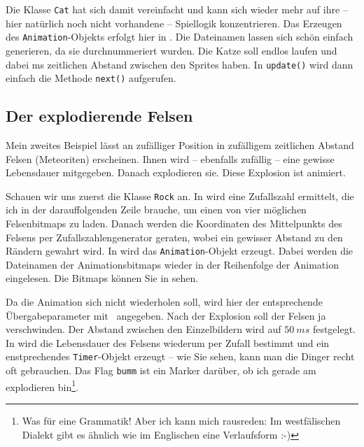 Die Klasse \texttt{Cat} hat sich damit vereinfacht und kann sich wieder mehr auf ihre -- hier natürlich noch nicht vorhandene -- Spiellogik konzentrieren. Das Erzeugen des \texttt{Animation}-Objekts erfolgt hier in . Die Dateinamen lassen sich schön einfach generieren, da sie durchnummeriert wurden. Die Katze soll endlos laufen und dabei \unit[100]{ms} zeitlichen Abstand zwischen den Sprites haben. In \texttt{update()} wird dann einfach die Methode \texttt{next()} aufgerufen.

\newpage
{} 

\subsection{Der explodierende Felsen}

Mein zweites Beispiel lässt an zufälliger Position in zufälligem zeitlichen Abstand Felsen (Meteoriten) erscheinen. Ihnen wird -- ebenfalls zufällig -- eine gewisse Lebensdauer mitgegeben. Danach explodieren sie. Diese Explosion ist animiert. 

Schauen wir uns zuerst die Klasse \texttt{Rock} an. In  wird eine Zufallszahl ermittelt, die ich in der darauffolgenden Zeile brauche, um einen von vier möglichen Felsenbitmaps zu laden. Danach werden die Koordinaten des Mittelpunkts des Felsens per Zufallszahlengenerator geraten, wobei ein gewisser Abstand zu den Rändern gewahrt wird. In  wird das \texttt{Animation}-Objekt erzeugt. Dabei werden die Dateinamen der Animationsbitmaps wieder in der Reihenfolge der Animation eingelesen. Die Bitmaps können Sie in  sehen. 

Da die Animation sich nicht wiederholen soll, wird hier der entsprechende Übergabeparameter mit \false\ angegeben. Nach der Explosion soll der Felsen ja verschwinden. Der Abstand zwischen den Einzelbildern wird auf $50~ms$ festgelegt. In  wird die Lebensdauer des Felsens wiederum per Zufall bestimmt und ein enstprechendes \texttt{Timer}-Objekt erzeugt -- wie Sie sehen, kann man die Dinger recht oft gebrauchen. Das Flag \texttt{bumm} ist ein Marker darüber, ob ich gerade am explodieren bin\footnote{Was für eine Grammatik! Aber ich kann mich rausreden: Im westfälischen Dialekt gibt es ähnlich wie im Englischen eine Verlaufsform :-)}. 

